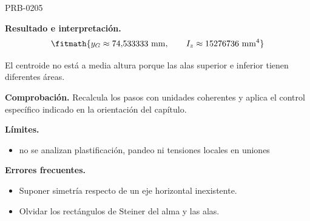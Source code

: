 \begin{studiumworked}{PRB-0205}
\begin{enumerate}
\end{enumerate}

\textbf{Resultado e interpretación.}\[\fitmath{y_G \approx 74{,}533333\ \mathrm{mm},\qquad I_z \approx 15276736\ \mathrm{mm^4}}\]

El centroide no está a media altura porque las alas superior e inferior tienen diferentes áreas.

\par\textbf{Comprobación.} Recalcula los pasos con unidades coherentes y aplica el control específico indicado en la orientación del capítulo.

\textbf{Límites.}\begin{itemize}\item no se analizan plastificación, pandeo ni tensiones locales en uniones\end{itemize}

\textbf{Errores frecuentes.}\begin{itemize}\item Suponer simetría respecto de un eje horizontal inexistente.
\item Olvidar los rectángulos de Steiner del alma y las alas.\end{itemize}

\end{studiumworked}

\Needspace{.3\textheight}

